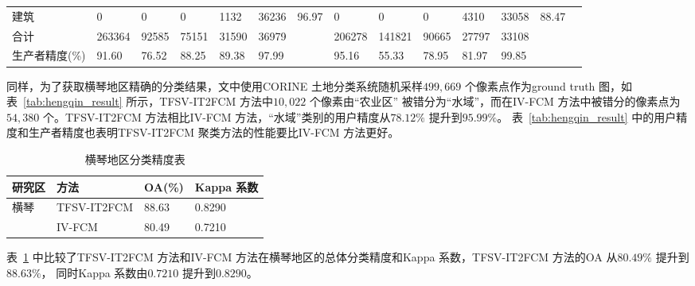\begin{table}[htbp]
{\begin{adjustbox}{max width=1.15\textwidth}
\begin{tabular} {llllllllllllll}
            建筑                                          & 0                                        & 0                                                 & 0                          & 1132                                              & 36236 & 96.97 & 0      & 0      & 0     & 4310  & 33058 & 88.47 \\
            合计                                          & 263364                                   & 92585                                             & 75151                      & 31590                                             & 36979 &       & 206278 & 141821 & 90665 & 27797 & 33108 &       \\
            生产者精度(\%)                                & 91.60                                    & 76.52                                             & 88.25                      & 89.38                                             & 97.99 &       & 95.16  & 55.33  & 78.95 & 81.97 & 99.85 &       \\
            \bottomrule
        \end{tabular}
    \end{adjustbox}}
\end{table}

同样，为了获取横琴地区精确的分类结果，文中使用CORINE 土地分类系统随机采样$499,669$ 个像素点作为ground truth 图，如表~\ref{tab:hengqin_result} 所示，TFSV-IT2FCM 方法中$10,022$ 个像素由“农业区” 被错分为“水域”，而在IV-FCM 方法中被错分的像素点为$54,380$ 个。TFSV-IT2FCM 方法相比IV-FCM 方法，“水域”类别的用户精度从$78.12\%$ 提升到$95.99\%$。 表~\ref{tab:hengqin_result} 中的用户精度和生产者精度也表明TFSV-IT2FCM 聚类方法的性能要比IV-FCM 方法更好。

\begin{table}[htbp]
    \caption{横琴地区分类精度表}\label{tab:hengqin_oa}
    \centering
    \begin{tabular}{llll}
        \toprule
        研究区 & 方法        & OA(\%) & Kappa 系数 \\
        \midrule
        横琴   & TFSV-IT2FCM & 88.63  & 0.8290     \\
               & IV-FCM      & 80.49  & 0.7210     \\
        \bottomrule
    \end{tabular}
\end{table}

表~\ref{tab:hengqin_oa} 中比较了TFSV-IT2FCM 方法和IV-FCM 方法在横琴地区的总体分类精度和Kappa 系数，TFSV-IT2FCM 方法的OA 从$80.49\%$ 提升到$88.63\%$， 同时Kappa 系数由$0.7210$ 提升到$0.8290$。


